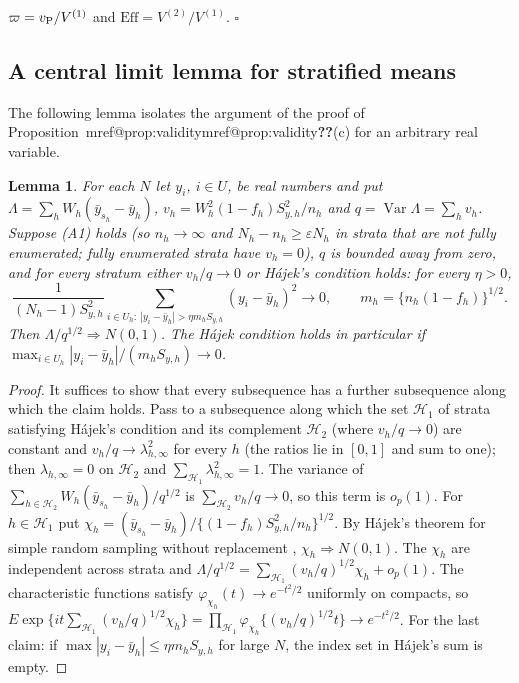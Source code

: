 \documentclass[pdflatex,sn-mathphys-num,iicol]{sn-jnl}
\makeatletter
\theoremstyle{thmstyleone}
\newtheorem{lemma}[proposition]{Lemma}
\theoremstyle{thmstyletwo}
\theoremstyle{thmstylethree}
\newcommand{\Mref}[1]{\ifcsname mref@#1\endcsname\csname mref@#1\endcsname\else\textbf{??}\fi}
\makeatother
\begin{document}
$\varpi=v_{\rm P}/V^{(1)}$ and $\mathrm{Eff}=V^{(2)}/V^{(1)}$. $\square$

\subsection{A central limit lemma for stratified means}\label{si:testing-clt}

The following lemma isolates the argument of the proof of Proposition~\Mref{prop:validity}(c) for an arbitrary real variable.

\begin{lemma}\label{lem:strat-clt}
For each $N$ let $y_i$, $i\in U$, be real numbers and put $\Lambda=\sum_hW_h(\bar y_{s_h}-\bar y_h)$, $v_h=W_h^2(1-f_h)S^2_{y,h}/n_h$ and $q=\operatorname{Var}\Lambda=\sum_hv_h$. Suppose (A1) holds (so $n_h\to\infty$ and $N_h-n_h\ge\varepsilon N_h$ in strata that are not fully enumerated; fully enumerated strata have $v_h=0$), $q$ is bounded away from zero, and for every stratum either $v_h/q\to0$ or Hájek's condition holds: for every $\eta>0$,
\[
\frac{1}{(N_h-1)S^2_{y,h}}\sum_{i\in U_h:\ |y_i-\bar y_h|>\eta m_hS_{y,h}}(y_i-\bar y_h)^2\to0,\qquad m_h=\{n_h(1-f_h)\}^{1/2}.
\]
Then $\Lambda/q^{1/2}\Rightarrow N(0,1)$. The Hájek condition holds in particular if $\max_{i\in U_h}|y_i-\bar y_h|/(m_hS_{y,h})\to0$.
\end{lemma}
\begin{proof}
It suffices to show that every subsequence has a further subsequence along which the claim holds. Pass to a subsequence along which the set $\mathcal H_1$ of strata satisfying Hájek's condition and its complement $\mathcal H_2$ (where $v_h/q\to0$) are constant and $v_h/q\to\lambda_{h,\infty}^2$ for every $h$ (the ratios lie in $[0,1]$ and sum to one); then $\lambda_{h,\infty}=0$ on $\mathcal H_2$ and $\sum_{\mathcal H_1}\lambda^2_{h,\infty}=1$. The variance of $\sum_{h\in\mathcal H_2}W_h(\bar y_{s_h}-\bar y_h)/q^{1/2}$ is $\sum_{\mathcal H_2}v_h/q\to0$, so this term is $o_p(1)$. For $h\in\mathcal H_1$ put $\chi_h=(\bar y_{s_h}-\bar y_h)/\{(1-f_h)S^2_{y,h}/n_h\}^{1/2}$. By Hájek's theorem for simple random sampling without replacement \citep{hajek1960}, $\chi_h\Rightarrow N(0,1)$. The $\chi_h$ are independent across strata and $\Lambda/q^{1/2}=\sum_{\mathcal H_1}(v_h/q)^{1/2}\chi_h+o_p(1)$. The characteristic functions satisfy $\varphi_{\chi_h}(t)\to e^{-t^2/2}$ uniformly on compacts, so
$E\exp\{it\sum_{\mathcal H_1}(v_h/q)^{1/2}\chi_h\}=\prod_{\mathcal H_1}\varphi_{\chi_h}\{(v_h/q)^{1/2}t\}\to e^{-t^2/2}$. For the last claim: if $\max|y_i-\bar y_h|\le\eta m_hS_{y,h}$ for large $N$, the index set in Hájek's sum is empty.
\end{proof}
\end{document}
